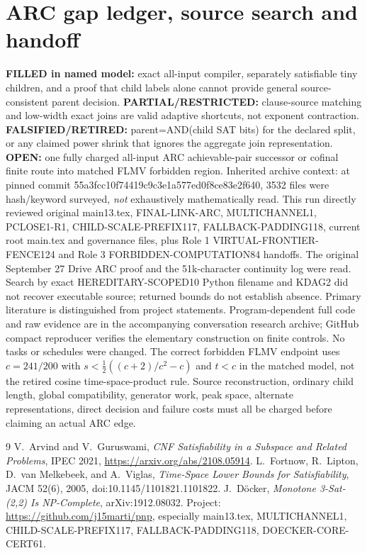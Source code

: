 \documentclass[11pt]{article}
\begin{document}
\section{ARC gap ledger, source search and handoff}
\noindent\textbf{FILLED in named model:} exact all-input compiler, separately satisfiable tiny children, and a proof that child labels alone cannot provide general source-consistent parent decision. \textbf{PARTIAL/RESTRICTED:} clause-source matching and low-width exact joins are valid adaptive shortcuts, not exponent contraction. \textbf{FALSIFIED/RETIRED:} parent=AND(child SAT bits) for the declared split, or any claimed power shrink that ignores the aggregate join representation. \textbf{OPEN:} one fully charged all-input ARC achievable-pair successor or cofinal finite route into matched FLMV forbidden region.
Inherited archive context: at pinned commit 55a3fcc10f74419c9c3e1a577ed0f8ce83e2f640, 3532 files were hash/keyword surveyed, \emph{not} exhaustively mathematically read. This run directly reviewed original main13.tex, FINAL-LINK-ARC, MULTICHANNEL1, PCLOSE1-R1, CHILD-SCALE-PREFIX117, FALLBACK-PADDING118, current root main.tex and governance files, plus Role 1 VIRTUAL-FRONTIER-FENCE124 and Role 3 FORBIDDEN-COMPUTATION84 handoffs. The original September 27 Drive ARC proof and the 51k-character continuity log were read. Search by exact HEREDITARY-SCOPED10 Python filename and KDAG2 did not recover executable source; returned bounds do not establish absence. Primary literature is distinguished from project statements. Program-dependent full code and raw evidence are in the accompanying conversation research archive; GitHub compact reproducer verifies the elementary construction on finite controls. No tasks or schedules were changed.
The correct forbidden FLMV endpoint uses $c=241/200$ with $s<\frac12((c+2)/c^2-c)$ and $t<c$ in the matched model, not the retired cosine time-space-product rule. Source reconstruction, ordinary child length, global compatibility, generator work, peak space, alternate representations, direct decision and failure costs must all be charged before claiming an actual ARC edge.
\begin{thebibliography}{9}
 V.~Arvind and V.~Guruswami, \emph{CNF Satisfiability in a Subspace and Related Problems}, IPEC 2021, \url{https://arxiv.org/abs/2108.05914}.
 L.~Fortnow, R.~Lipton, D.~van Melkebeek, and A.~Viglas, \emph{Time-Space Lower Bounds for Satisfiability}, JACM 52(6), 2005, doi:10.1145/1101821.1101822.
 J.~D\"ocker, \emph{Monotone 3-Sat-(2,2) Is NP-Complete}, arXiv:1912.08032.
 Project: \url{https://github.com/j15marti/pnp}, especially main13.tex, MULTICHANNEL1, CHILD-SCALE-PREFIX117, FALLBACK-PADDING118, DOECKER-CORE-CERT61.
\end{thebibliography}
\end{document}
